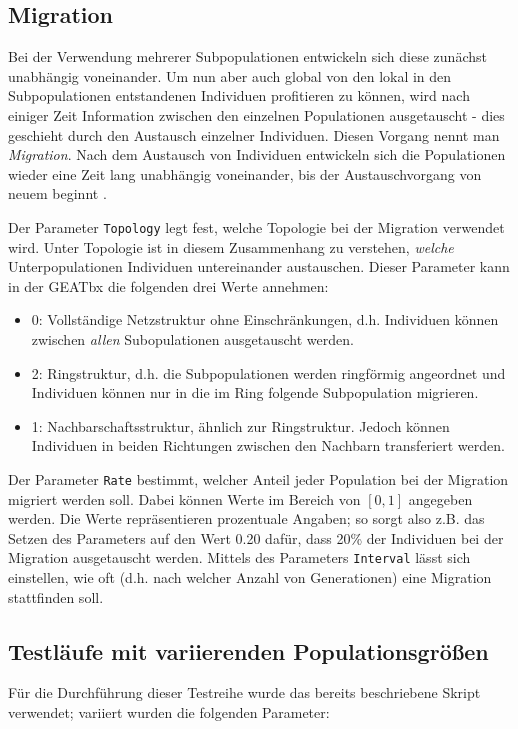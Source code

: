 \subsection{Migration}
Bei der Verwendung mehrerer Subpopulationen entwickeln sich diese zunächst 
unabhängig voneinander. Um nun aber auch global von den lokal in den 
Subpopulationen entstandenen Individuen profitieren zu können, wird nach 
einiger Zeit Information zwischen den einzelnen Populationen ausgetauscht - 
dies geschieht durch den Austausch einzelner Individuen. Diesen Vorgang nennt 
man \textsl{Migration}. Nach dem Austausch von Individuen entwickeln sich die 
Populationen wieder eine Zeit lang unabhängig voneinander, bis der 
Austauschvorgang von neuem beginnt \cite{url:geatbx-documentation}.

Der Parameter \texttt{Topology} legt fest, welche Topologie bei der Migration 
verwendet wird. Unter Topologie ist in diesem Zusammenhang zu verstehen, 
\textsl{welche} Unterpopulationen Individuen untereinander austauschen. Dieser 
Parameter kann in der GEATbx die folgenden drei Werte annehmen:

\begin{itemize}
  \item 0: Vollständige Netzstruktur ohne Einschränkungen, d.h. Individuen 
  können zwischen \textsl{allen} Subopulationen ausgetauscht werden.
  \item 2: Ringstruktur, d.h. die Subpopulationen werden ringförmig angeordnet 
  und Individuen können nur in die im Ring folgende Subpopulation migrieren.
  \item 1: Nachbarschaftsstruktur, ähnlich zur Ringstruktur. Jedoch können 
  Individuen in beiden Richtungen zwischen den Nachbarn transferiert werden.
\end{itemize}

Der Parameter \texttt{Rate} bestimmt, welcher Anteil jeder Population bei der 
Migration migriert werden soll. Dabei können Werte im Bereich von $[0, 1]$ 
angegeben werden. Die Werte repräsentieren prozentuale Angaben; so sorgt also 
z.B. das Setzen des Parameters auf den Wert 0.20 dafür, dass 20\% der 
Individuen bei der Migration ausgetauscht werden. Mittels des Parameters 
\texttt{Interval} lässt sich einstellen, wie oft (d.h. nach welcher Anzahl von 
Generationen) eine Migration stattfinden soll.

\subsection{Testläufe mit variierenden Populationsgrößen}
\label{subsec:TestlaeufePopulationsgroessen}
Für die Durchführung dieser Testreihe wurde das bereits beschriebene Skript 
verwendet; variiert wurden die folgenden Parameter:

